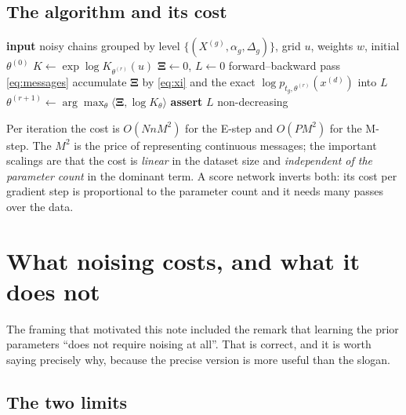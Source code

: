 \documentclass[11pt]{article}
\theoremstyle{remark}
\newcommand{\Xibf}{\bm{\Xi}}
\begin{document}
\subsection{The algorithm and its cost}

\begin{algorithm}[H]
\caption{EM for a chain prior observed through the OU channel}
\begin{algorithmic}[1]
\State \textbf{input} noisy chains grouped by level $\{(X^{(g)}, \alpha_g, \Delta_g)\}$,
       grid $u$, weights $w$, initial $\theta^{(0)}$
  \State $K \gets \exp \log K_{\theta^{(r)}}(u)$
  \State $\Xibf \gets 0$,\; $L \gets 0$
    \State forward--backward pass \eqref{eq:messages}
    \State accumulate $\Xibf$ by \eqref{eq:xi} and the exact
           $\log p_{t_g,\theta^{(r)}}(x^{(d)})$ into $L$
  \EndFor
  \State $\theta^{(r+1)} \gets \arg\max_\theta \langle \Xibf, \log K_\theta\rangle$
  \State \textbf{assert} $L$ non-decreasing
\EndFor
\end{algorithmic}
\end{algorithm}

Per iteration the cost is $O(N n M^2)$ for the E-step and $O(P M^2)$ for the
M-step. The $M^2$ is the price of representing continuous messages; the
important scalings are that the cost is \emph{linear} in the dataset size and
\emph{independent of the parameter count} in the dominant term. A score network
inverts both: its cost per gradient step is proportional to the parameter count
and it needs many passes over the data.

\section{What noising costs, and what it does not}
\label{sec:noising}

The framing that motivated this note included the remark that learning the prior
parameters ``does not require noising at all''. That is correct, and it is worth
saying precisely why, because the precise version is more useful than the slogan.

\subsection{The two limits}
\end{document}
